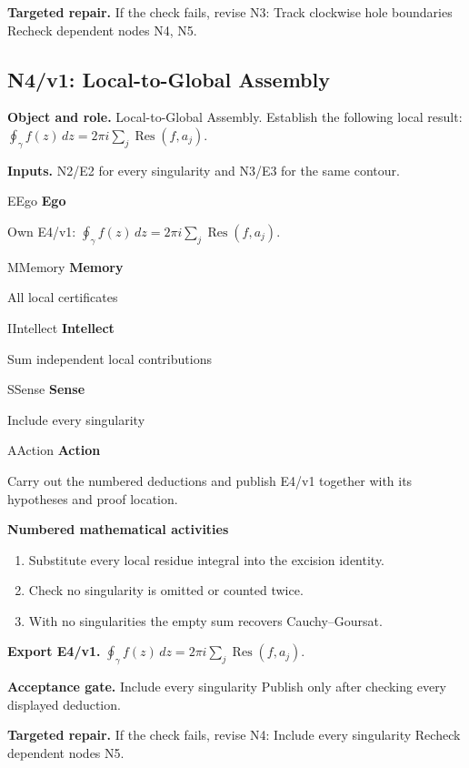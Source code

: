 \documentclass[preprint,12pt,aps,pra,showkeys,amsmath,amssymb,superscriptaddress,floatfix]{revtex4-2}
\theoremstyle{definition}
\theoremstyle{remark}
\newcommand{\mmfaculty}[3]{%
 \begin{mmfacultybox}{#1}{#2}
 {\sffamily\bfseries\color{MMBlue}#2}\par\smallskip #3
 \end{mmfacultybox}}
\newcommand{\field}[2]{\par\smallskip\noindent\textbf{#1.} #2\par}
\begin{document}
\field{Targeted repair}{If the check fails, revise N3: Track clockwise hole boundaries Recheck
dependent nodes N4, N5.}

\clearpage

\subsection{N4/v1: Local-to-Global Assembly}

\field{Object and role}{Local-to-Global Assembly. Establish the following local result:
\(\oint_\gamma f(z)\,dz=2\pi i\sum_j\operatorname{Res}(f,a_j)\).}

\field{Inputs}{N2/E2 for every singularity and N3/E3 for the same contour.}

\mmfaculty{E}{Ego}{Own E4/v1:
\(\oint_\gamma f(z)\,dz=2\pi i\sum_j\operatorname{Res}(f,a_j)\).}

\mmfaculty{M}{Memory}{All local certificates}

\mmfaculty{I}{Intellect}{Sum independent local contributions}

\mmfaculty{S}{Sense}{Include every singularity}

\mmfaculty{A}{Action}{Carry out the numbered deductions and publish E4/v1 together with its
hypotheses and proof location.}

\smallskip\noindent\textbf{Numbered mathematical activities}

\begin{enumerate}[label=N4.\arabic*,leftmargin=3.4em]

\item Substitute every local residue integral into the excision identity.

\item Check no singularity is omitted or counted twice.

\item With no singularities the empty sum recovers Cauchy--Goursat.

\end{enumerate}

\field{Export E4/v1}{\(\oint_\gamma f(z)\,dz=2\pi i\sum_j\operatorname{Res}(f,a_j)\).}

\field{Acceptance gate}{Include every singularity Publish only after checking every displayed
deduction.}

\field{Targeted repair}{If the check fails, revise N4: Include every singularity Recheck
dependent nodes N5.}

\clearpage
\end{document}
